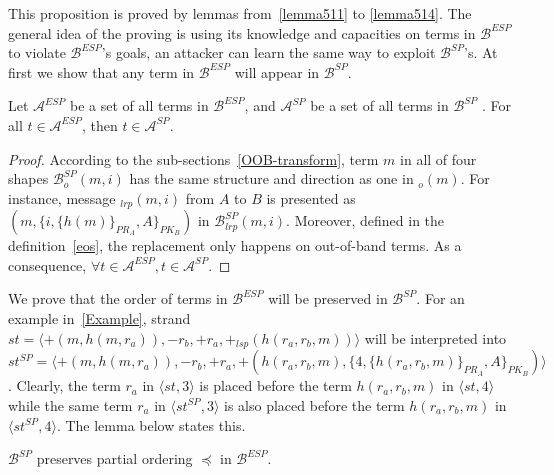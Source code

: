 This proposition is proved by lemmas from~\ref{lemma511} to \ref{lemma514}. The general idea of the proving is using its knowledge and capacities on terms in $\mathcal{B}^{ESP}$ to violate $\mathcal{B}^{ESP}$'s goals, an attacker can learn the same way to exploit $\mathcal{B}^{SP}$'s. At first we show that any term in $\mathcal{B}^{ESP}$ will appear in $\mathcal{B}^{SP}$. 

\begin{Lemma}\label{lemma511}
Let $\mathcal{A}^{ESP}$ be a set of all terms in $\mathcal{B}^{ESP}$, and $\mathcal{A}^{SP}$ be a set of all terms in $\mathcal{B}^{SP}$ . For all $t \in \mathcal{A}^{ESP}$, then $t \in \mathcal{A}^{SP}$. 
\end{Lemma}
\begin{proof}
According to the sub-sections~\ref{OOB-transform}, term $m$ in all of four shapes $\mathcal{B}^{SP}_o(m,i)$ has the same structure and direction as one in $_o(m)$. For instance, message $_{lrp}(m,i)$ from $A$ to $B$ is presented as $(m, \{i,\{h(m)\}_{PR_A},A\}_{PK_B})$ in $\mathcal{B}^{SP}_{lrp}(m,i)$. Moreover, defined in the definition~\ref{eos}, the replacement only happens on out-of-band terms. As a consequence, $\forall t \in \mathcal{A}^{ESP}, t \in \mathcal{A}^{SP}$.
\end{proof}

We prove that the order of terms in $\mathcal{B}^{ESP}$ will be preserved in $\mathcal{B}^{SP}$. For an example in~\ref{Example}, strand $st =\langle +(m,h(m,r_a)), -r_b, +r_a, +_{lsp}(h(r_a,r_b,m)) \rangle$ will be interpreted into $st^{SP} = \langle +(m,h(m,r_a)), -r_b, +r_a, +(h(r_a,r_b,m),\{4,\{h(r_a,r_b,m)\}_{PR_A},A\}_{PK_B})\rangle$. Clearly, the term $r_a$ in $\langle st,3 \rangle$ is placed before the term $h(r_a,r_b,m)$ in $\langle st,4 \rangle$ while the same term $r_a$ in $\langle st^{SP},3 \rangle$ is also placed before the term $h(r_a,r_b,m)$ in $\langle st^{SP},4 \rangle$. The lemma below states this. 

\begin{Lemma}\label{lemma512}
$\mathcal{B}^{SP}$ preserves partial ordering $\preceq$ in $\mathcal{B}^{ESP}$.    
\end{Lemma}

